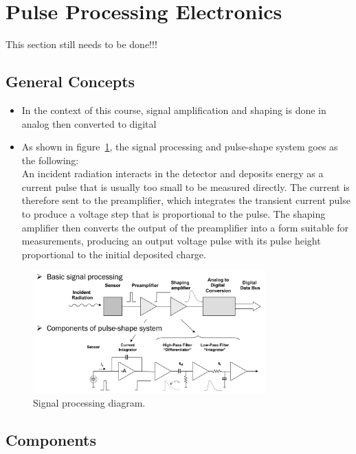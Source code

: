\section{Pulse Processing Electronics}
{\color{red} This section still needs to be done!!!}
\subsection{General Concepts}
\begin{itemize}
    \item In the context of this course, signal amplification and shaping is done in analog then converted to digital  
    \item As shown in figure~\ref{fig:signal_processing}, the signal processing and pulse-shape system goes as the following:\\
    An incident radiation interacts in the detector and deposits energy as a current pulse that is usually too small to be measured directly. The current is therefore sent to the preamplifier, which integrates the transient current pulse to produce a voltage step that is proportional to the pulse. The shaping amplifier then converts the output of the preamplifier into a form suitable for measurements, producing an output voltage pulse with its pulse height proportional to the initial deposited charge. 
\end{itemize}
\begin{figure}[ht]
    \centering
    \includegraphics[width=0.8\textwidth]{images/signal_processing_diagram.png}
    \caption{Signal processing diagram.}
    \label{fig:signal_processing}
\end{figure}
\subsection{Components}

